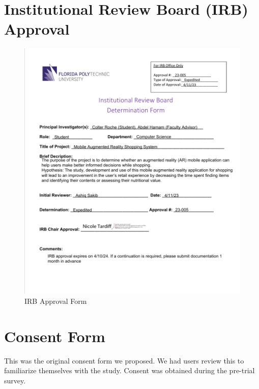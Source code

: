 \documentclass[thesis]{fputhesis}
\begin{document}
\begin{body}
\begin{appendices}
\section{Institutional Review Board (IRB) Approval}
\begin{figure}[h]
    \centering
    \includegraphics[width=0.8\linewidth]{Images/IRB Approval.png}
    \caption{IRB Approval Form}
    \label{fig:irb}
\end{figure}

\section{Consent Form}
This was the original consent form we proposed. We had users review this to familiarize themselves with the study. Consent was obtained during the pre-trial survey.


\end{appendices}
\end{body}
\end{document}
